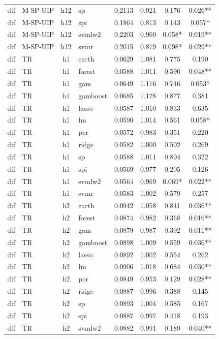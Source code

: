 \begin{ThreePartTable}
\begin{longtable}[t]{llclcccc}
dif & M-SP-UIP & h12 & sp & 0.2113 & 0.921 & 0.176 & 0.026**\\
dif & M-SP-UIP & h12 & spi & 0.1864 & 0.813 & 0.143 & 0.057*\\
dif & M-SP-UIP & h12 & svmlw2 & 0.2203 & 0.960 & 0.058* & 0.019**\\
dif & M-SP-UIP & h12 & svmr & 0.2015 & 0.879 & 0.098* & 0.029**\\
\addlinespace
dif & TR & h1 & earth & 0.0629 & 1.081 & 0.775 & 0.190\\
dif & TR & h1 & forest & 0.0588 & 1.011 & 0.590 & 0.048**\\
dif & TR & h1 & gam & 0.0649 & 1.116 & 0.746 & 0.053*\\
dif & TR & h1 & gamboost & 0.0685 & 1.178 & 0.877 & 0.381\\
dif & TR & h1 & lasso & 0.0587 & 1.010 & 0.833 & 0.635\\
dif & TR & h1 & lm & 0.0590 & 1.014 & 0.561 & 0.058*\\
dif & TR & h1 & pcr & 0.0572 & 0.983 & 0.351 & 0.220\\
dif & TR & h1 & ridge & 0.0582 & 1.000 & 0.502 & 0.269\\
dif & TR & h1 & sp & 0.0588 & 1.011 & 0.804 & 0.322\\
dif & TR & h1 & spi & 0.0569 & 0.977 & 0.205 & 0.126\\
dif & TR & h1 & svmlw2 & 0.0564 & 0.969 & 0.069* & 0.022**\\
dif & TR & h1 & svmr & 0.0583 & 1.002 & 0.579 & 0.257\\
\addlinespace
dif & TR & h2 & earth & 0.0942 & 1.058 & 0.841 & 0.036**\\
dif & TR & h2 & forest & 0.0874 & 0.982 & 0.368 & 0.016**\\
dif & TR & h2 & gam & 0.0879 & 0.987 & 0.392 & 0.011**\\
dif & TR & h2 & gamboost & 0.0898 & 1.009 & 0.559 & 0.036**\\
dif & TR & h2 & lasso & 0.0892 & 1.002 & 0.554 & 0.262\\
dif & TR & h2 & lm & 0.0906 & 1.018 & 0.684 & 0.030**\\
dif & TR & h2 & pcr & 0.0849 & 0.953 & 0.129 & 0.028**\\
dif & TR & h2 & ridge & 0.0887 & 0.996 & 0.388 & 0.145\\
dif & TR & h2 & sp & 0.0893 & 1.004 & 0.585 & 0.167\\
dif & TR & h2 & spi & 0.0887 & 0.997 & 0.418 & 0.193\\
dif & TR & h2 & svmlw2 & 0.0882 & 0.991 & 0.189 & 0.040**\\

\end{longtable}
\end{ThreePartTable}
